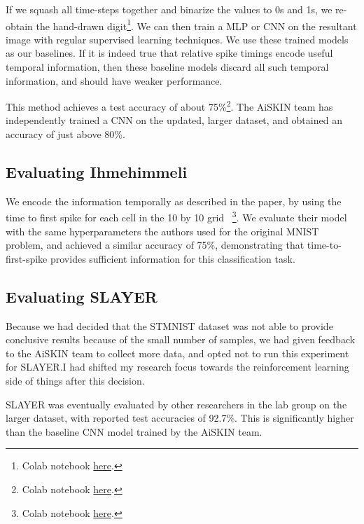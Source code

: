 \documentclass[fyp]{socreport}
\begin{document}
If we squash all time-steps together and binarize the values to 0s and 1s, we
re-obtain the hand-drawn digit\footnote{Colab notebook
\href{https://colab.research.google.com/drive/1EEZSOmGzvNcsGbCXiw1p7GyM5RBVv4uy}{here}.}. We
can then train a MLP or CNN on the resultant image with regular supervised
learning techniques. We use these trained models as our baselines. If it is
indeed true that relative spike timings encode useful temporal information, then
these baseline models discard all such temporal information, and should have
weaker performance.

This method achieves a test accuracy of about 75\%\footnote{Colab notebook
  \href{https://colab.research.google.com/drive/1Tig07aWvKKDnJ1VUwUf31wLpUjvupGDp}{here}.}. The
AiSKIN team has independently trained a CNN on the updated, larger dataset, and
obtained an accuracy of just above 80\%.

\subsection{Evaluating Ihmehimmeli}

We encode the information temporally as described in the paper, by using the
time to first spike for each cell in the 10 by 10 grid
~\cite{comsa19_tempor_codin_spikin_neural_networ}\footnote{Colab notebook
\href{https://colab.research.google.com/drive/144bSlbCXV8Rce0mAvq42byq3alMW7PXl}{here}.}. We
evaluate their model with the same hyperparameters the authors used for the
original MNIST problem, and achieved a similar accuracy of 75\%, demonstrating
that time-to-first-spike provides sufficient information for this classification
task.

\subsection{Evaluating SLAYER}

Because we had decided that the STMNIST dataset was not able to provide
conclusive results because of the small number of samples, we had given feedback
to the AiSKIN team to collect more data, and opted not to run this experiment
for SLAYER.\@ I had shifted my research focus towards the reinforcement learning
side of things after this decision.

SLAYER was eventually evaluated by other researchers in the lab group on the
larger dataset, with reported test accuracies of 92.7\%. This is significantly
higher than the baseline CNN model trained by the AiSKIN team.
\end{document}
